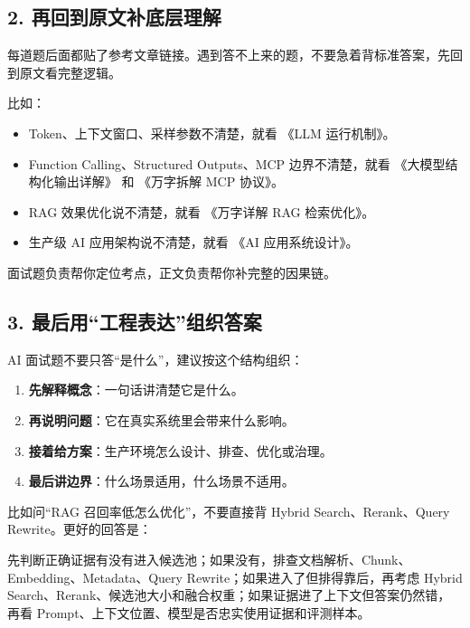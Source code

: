 \documentclass[10pt,a4paper]{ctexart}
\begin{document}
\subsection{2. 再回到原文补底层理解}


每道题后面都贴了参考文章链接。遇到答不上来的题，不要急着背标准答案，先回到原文看完整逻辑。



比如：


\begin{itemize}[itemsep=2pt, topsep=4pt]
  \item Token、上下文窗口、采样参数不清楚，就看 《LLM 运行机制》。
  \item Function Calling、Structured Outputs、MCP 边界不清楚，就看 《大模型结构化输出详解》 和 《万字拆解 MCP 协议》。
  \item RAG 效果优化说不清楚，就看 《万字详解 RAG 检索优化》。
  \item 生产级 AI 应用架构说不清楚，就看 《AI 应用系统设计》。
\end{itemize}


面试题负责帮你定位考点，正文负责帮你补完整的因果链。



\subsection{3. 最后用“工程表达”组织答案}


AI 面试题不要只答“是什么”，建议按这个结构组织：


\begin{enumerate}[itemsep=2pt, topsep=4pt]
  \item \textbf{先解释概念}：一句话讲清楚它是什么。
  \item \textbf{再说明问题}：它在真实系统里会带来什么影响。
  \item \textbf{接着给方案}：生产环境怎么设计、排查、优化或治理。
  \item \textbf{最后讲边界}：什么场景适用，什么场景不适用。
\end{enumerate}


比如问“RAG 召回率低怎么优化”，不要直接背 Hybrid Search、Rerank、Query Rewrite。更好的回答是：



先判断正确证据有没有进入候选池；如果没有，排查文档解析、Chunk、Embedding、Metadata、Query Rewrite；如果进入了但排得靠后，再考虑 Hybrid Search、Rerank、候选池大小和融合权重；如果证据进了上下文但答案仍然错，再看 Prompt、上下文位置、模型是否忠实使用证据和评测样本。
\end{document}
